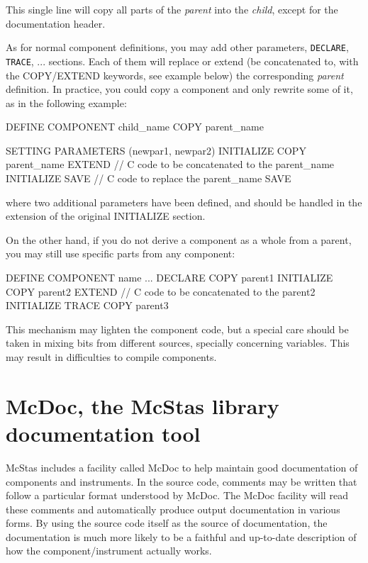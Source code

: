 This single line will copy all parts of the \textit{parent} into the \textit{child}, except for the documentation header.

As for normal component definitions, you may add other parameters,
\texttt{DECLARE}, \texttt{TRACE}, ... sections. Each of them will replace or
extend (be concatenated to, with the COPY/EXTEND keywords, see example below)
the corresponding \textit{parent} definition. In practice, you could copy a
component and only rewrite some of it, as in the following example:

\begin{mcstas}
DEFINE COMPONENT  child_name COPY parent_name

  SETTING PARAMETERS (newpar1, newpar2) 
  INITIALIZE COPY  parent_name EXTEND 
// C code to be concatenated to the  parent_name INITIALIZE
  SAVE
// C code to replace the  parent_name SAVE 
\end{mcstas}
where two additional parameters have been defined, and should be handled in the
extension of the original INITIALIZE section.

On the other hand, if you do not derive a component as a whole from a parent,
you may still use specific parts from any component:
\begin{mcstas}
DEFINE COMPONENT  name ...
  DECLARE COPY  parent1 
  INITIALIZE COPY  parent2 EXTEND 
// C code to be concatenated to the  parent2 INITIALIZE
TRACE COPY  parent3
\end{mcstas}

This mechanism may lighten the component code, but a special care should be taken in mixing bits from different sources, specially concerning variables. This may result in difficulties to compile components.


\section{McDoc, the McStas library documentation tool}
\label{s:mcdoc}

McStas includes a facility called McDoc to help maintain good documentation of
components and instruments. In the source code, comments may be
written that follow a particular format understood by McDoc. The McDoc facility
will read these comments and automatically produce output documentation in
various forms. By using the source code itself as the source of documentation,
the documentation is much more likely to be a faithful and up-to-date
description of how the component/instrument actually works.

